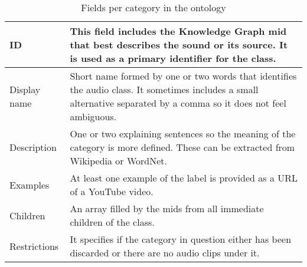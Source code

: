 
\begin{table}[h!]
\begin{center}
	\begin{tabular}{|| m{7em} | m{22em} ||}
		\hline
		ID & This field includes the Knowledge Graph \acrfull{mid} that best describes the sound or its source. It is used as a primary identifier for the class. \\
		\hline
		Display name & Short name formed by one or two words that identifies the audio class. It sometimes includes a small alternative separated by a comma so it does not feel ambiguous. \\
		\hline
		Description & One or two explaining sentences so the meaning of the category is more defined. These can be extracted from Wikipedia or WordNet. \\
		\hline
		Examples & At least one example of the label is provided as a URL of a YouTube video. \\
		\hline
		Children & An array filled by the \acrfull{mid}s from all immediate children of the class. \\
		\hline
		Restrictions & It specifies if the category in question either has been discarded or there are no audio clips under it. \\
		\hline
	\end{tabular}
\end{center}
\caption{Fields per category in the ontology}
\label{table:2}
\end{table}